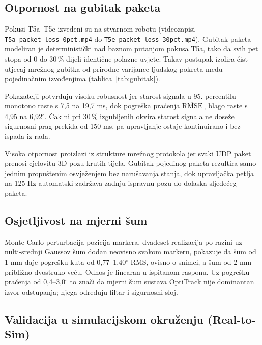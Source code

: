 \subsection{Otpornost na gubitak paketa}

Pokusi T5a--T5e izvedeni su na stvarnom robotu (videozapisi \texttt{T5a\_packet\_loss\_0pct.mp4} do \texttt{T5e\_packet\_loss\_30pct.mp4}). Gubitak paketa modeliran je deterministički nad baznom putanjom pokusa T5a, tako da svih pet stopa od 0 do 30\,\% dijeli identične polazne uvjete. Takav postupak izolira čist utjecaj mrežnog gubitka od prirodne varijance ljudskog pokreta među pojedinačnim izvođenjima (tablica~\ref{tab:gubitak}).

Pokazatelji potvrđuju visoku robusnost jer starost signala u 95. percentilu monotono raste s 7,5 na 19,7 ms, dok pogreška praćenja $\overline{\text{RMSE}}_\text{p}$ blago raste s 4,95 na 6,92$^\circ$. Čak ni pri 30\,\% izgubljenih okvira starost signala ne doseže sigurnosni prag prekida od 150 ms, pa upravljanje ostaje kontinuirano i bez ispada iz rada.

Visoka otpornost proizlazi iz strukture mrežnog protokola jer svaki UDP paket prenosi cjelovitu 3D pozu krutih tijela. Gubitak pojedinog paketa rezultira samo jednim propuštenim osvježenjem bez narušavanja stanja, dok upravljačka petlja na 125 Hz automatski zadržava zadnju ispravnu pozu do dolaska sljedećeg paketa.

\begin{table}[H]
  \caption{Ispitivanje otpornosti na gubitak paketa (T5a--T5e).}
  \label{tab:gubitak}
  \centering\small
  
\end{table}

\subsection{Osjetljivost na mjerni šum}

Monte Carlo perturbacija pozicija markera, dvadeset realizacija po razini uz
nulti-srednji Gaussov šum dodan neovisno svakom markeru, pokazuje da šum od 1 mm
daje pogrešku kuta od 0,77--1,40$^\circ$ RMS, ovisno o snimci, a šum od 2 mm
približno dvostruko veću. Odnos je linearan u ispitanom rasponu. Uz pogrešku praćenja od
0,4--3,0$^\circ$ to znači da mjerni šum sustava OptiTrack nije dominantan izvor
odstupanja; njega određuju filtar i sigurnosni sloj.

\subsection{Validacija u simulacijskom okruženju (Real-to-Sim)}

